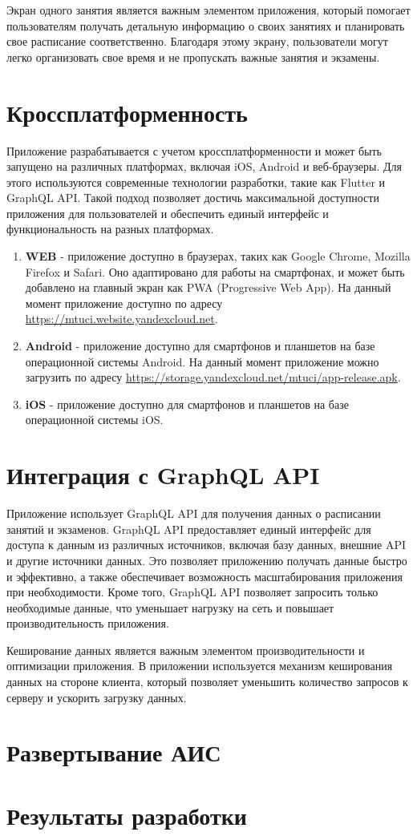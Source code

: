 Экран одного занятия является важным элементом приложения,
который помогает пользователям получать детальную информацию
о своих занятиях и планировать свое расписание соответственно.
Благодаря этому экрану, пользователи могут легко организовать
свое время и не пропускать важные занятия и экзамены.

\section{Кроссплатформенность}
Приложение разрабатывается с учетом кроссплатформенности и может быть запущено на различных платформах,
включая iOS, Android и веб-браузеры.
Для этого используются современные технологии разработки, такие как Flutter и GraphQL API.
Такой подход позволяет достичь максимальной доступности приложения для пользователей и обеспечить единый
интерфейс и функциональность на разных платформах.

\begin{enumerate}
    \item \textbf{WEB} - приложение доступно в браузерах, таких как Google Chrome, Mozilla Firefox и Safari. 
    Оно адаптировано для работы на смартфонах, и может быть добавлено на главный экран как PWA (Progressive Web App).
    На данный момент приложение доступно по адресу \url{https://mtuci.website.yandexcloud.net}.
    \item \textbf{Android} - приложение доступно для смартфонов и планшетов на базе операционной системы Android.
    На данный момент приложение можно загрузить по адресу \url{https://storage.yandexcloud.net/mtuci/app-release.apk}.
    \item \textbf{iOS} - приложение доступно для смартфонов и планшетов на базе операционной системы iOS.
\end{enumerate}

\section{Интеграция с GraphQL API}
Приложение использует GraphQL API для получения данных о расписании занятий и экзаменов. 
GraphQL API предоставляет единый интерфейс для доступа к данным из различных источников, 
включая базу данных, внешние API и другие источники данных. 
Это позволяет приложению получать данные быстро и эффективно, 
а также обеспечивает возможность масштабирования приложения при необходимости. 
Кроме того, GraphQL API позволяет запросить только необходимые данные, 
что уменьшает нагрузку на сеть и повышает производительность приложения.

Кеширование данных является важным элементом производительности и оптимизации приложения. 
В приложении используется механизм кеширования данных на стороне клиента, 
который позволяет уменьшить количество запросов к серверу и ускорить загрузку данных.

\section{Развертывание АИС}

\section{Результаты разработки}